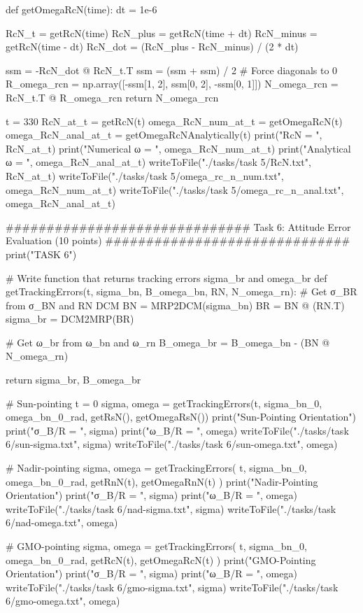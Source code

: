 \documentclass[conf]{new-aiaa}
\begin{document}
\begin{pythoncode}
def getOmegaRcN(time):
    dt = 1e-6

    RcN_t = getRcN(time)
    RcN_plus = getRcN(time + dt)
    RcN_minus = getRcN(time - dt)
    RcN_dot = (RcN_plus - RcN_minus) / (2 * dt)

    ssm = -RcN_dot @ RcN_t.T
    ssm = (ssm + ssm) / 2  # Force diagonals to 0
    R_omega_rcn = np.array([-ssm[1, 2], ssm[0, 2], -ssm[0, 1]])
    N_omega_rcn = RcN_t.T @ R_omega_rcn
    return N_omega_rcn


t = 330
RcN_at_t = getRcN(t)
omega_RcN_num_at_t = getOmegaRcN(t)
omega_RcN_anal_at_t = getOmegaRcNAnalytically(t)
print("RcN = ", RcN_at_t)
print("Numerical ω = ", omega_RcN_num_at_t)
print("Analytical ω = ", omega_RcN_anal_at_t)
writeToFile("./tasks/task 5/RcN.txt", RcN_at_t)
writeToFile("./tasks/task 5/omega_rc_n_num.txt", omega_RcN_num_at_t)
writeToFile("./tasks/task 5/omega_rc_n_anal.txt", omega_RcN_anal_at_t)


############################## Task 6: Attitude Error Evaluation (10 points) ##############################
print("\n\nBEGIN TASK 6")


# Write function that returns tracking errors sigma_br and omega_br
def getTrackingErrors(t, sigma_bn, B_omega_bn, RN, N_omega_rn):
    # Get σ_BR from σ_BN and RN DCM
    BN = MRP2DCM(sigma_bn)
    BR = BN @ (RN.T)
    sigma_br = DCM2MRP(BR)

    # Get ω_br from ω_bn and ω_rn
    B_omega_br = B_omega_bn - (BN @ N_omega_rn)

    return sigma_br, B_omega_br


# Sun-pointing
t = 0
sigma, omega = getTrackingErrors(t, sigma_bn_0, omega_bn_0_rad, getRsN(), getOmegaRsN())
print("Sun-Pointing Orientation")
print("σ_B/R = ", sigma)
print("ω_B/R = ", omega)
writeToFile("./tasks/task 6/sun-sigma.txt", sigma)
writeToFile("./tasks/task 6/sun-omega.txt", omega)

# Nadir-pointing
sigma, omega = getTrackingErrors(
    t, sigma_bn_0, omega_bn_0_rad, getRnN(t), getOmegaRnN(t)
)
print("Nadir-Pointing Orientation")
print("σ_B/R = ", sigma)
print("ω_B/R = ", omega)
writeToFile("./tasks/task 6/nad-sigma.txt", sigma)
writeToFile("./tasks/task 6/nad-omega.txt", omega)

# GMO-pointing
sigma, omega = getTrackingErrors(
    t, sigma_bn_0, omega_bn_0_rad, getRcN(t), getOmegaRcN(t)
)
print("GMO-Pointing Orientation")
print("σ_B/R = ", sigma)
print("ω_B/R = ", omega)
writeToFile("./tasks/task 6/gmo-sigma.txt", sigma)
writeToFile("./tasks/task 6/gmo-omega.txt", omega)



\end{pythoncode}
\end{document}
